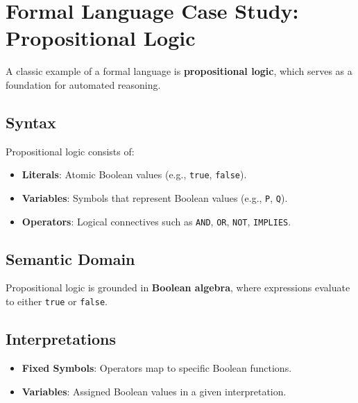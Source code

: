\documentclass{book}
\providecommand{\tightlist}{%
  \setlength{\itemsep}{0pt}\setlength{\parskip}{0pt}}
\begin{document}
\hypertarget{book__pandoc__debug__src__languages.md__formal-language-case-study-propositional-logic}{%
\section*{Formal Language Case Study: Propositional Logic}\label{book__pandoc__debug__src__languages.md__formal-language-case-study-propositional-logic}}

A classic example of a formal language is \textbf{propositional logic}, which serves as a foundation for automated reasoning.

\hypertarget{book__pandoc__debug__src__languages.md__syntax}{%
\subsection*{Syntax}\label{book__pandoc__debug__src__languages.md__syntax}}

Propositional logic consists of:

\begin{itemize}
\tightlist
\item
  \textbf{Literals}: Atomic Boolean values (e.g., \texttt{true}, \texttt{false}).
\item
  \textbf{Variables}: Symbols that represent Boolean values (e.g., \texttt{P}, \texttt{Q}).
\item
  \textbf{Operators}: Logical connectives such as \texttt{AND}, \texttt{OR}, \texttt{NOT}, \texttt{IMPLIES}.
\end{itemize}

\hypertarget{book__pandoc__debug__src__languages.md__semantic-domain}{%
\subsection*{Semantic Domain}\label{book__pandoc__debug__src__languages.md__semantic-domain}}

Propositional logic is grounded in \textbf{Boolean algebra}, where expressions evaluate to either \texttt{true} or \texttt{false}.

\hypertarget{book__pandoc__debug__src__languages.md__interpretations}{%
\subsection*{Interpretations}\label{book__pandoc__debug__src__languages.md__interpretations}}

\begin{itemize}
\tightlist
\item
  \textbf{Fixed Symbols}: Operators map to specific Boolean functions.
\item
  \textbf{Variables}: Assigned Boolean values in a given interpretation.
\end{itemize}
\end{document}
